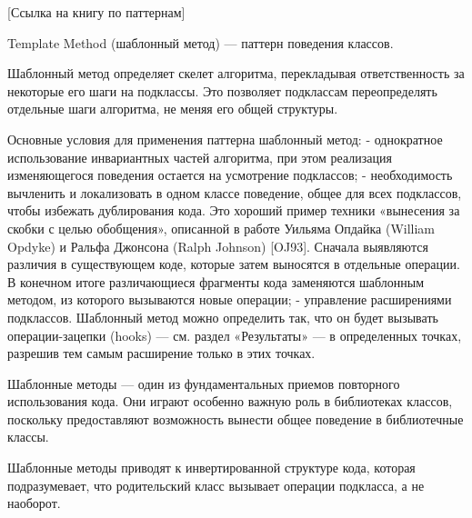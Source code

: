 


[Ссылка на книгу по паттернам]

Template Method (шаблонный метод) — паттерн поведения классов.

Шаблонный метод определяет скелет алгоритма, перекладывая ответственность за некоторые его шаги на подклассы. Это позволяет подклассам переопределять отдельные шаги алгоритма, не меняя его общей структуры.

Основные условия для применения паттерна шаблонный метод:
- однократное использование инвариантных частей алгоритма, при этом реализация изменяющегося поведения остается на усмотрение подклассов;
- необходимость вычленить и локализовать в одном классе поведение,
общее для всех подклассов, чтобы избежать дублирования кода. Это
хороший пример техники «вынесения за скобки с целью обобщения»,
описанной в работе Уильяма Опдайка (William Opdyke) и Ральфа
Джонсона (Ralph Johnson) [OJ93]. Сначала выявляются различия в существующем коде, которые затем выносятся в отдельные операции.
В конечном итоге различающиеся фрагменты кода заменяются шаблонным методом, из которого вызываются новые операции;
- управление расширениями подклассов. Шаблонный метод можно определить так, что он будет вызывать операции-зацепки (hooks) — см. раздел «Результаты» — в определенных точках, разрешив тем самым расширение только в этих точках.

Шаблонные методы — один из фундаментальных приемов повторного
использования кода. Они играют особенно важную роль в библиотеках
классов, поскольку предоставляют возможность вынести общее поведение
в библиотечные классы.

Шаблонные методы приводят к инвертированной структуре кода, которая подразумевает, что родительский класс вызывает операции подкласса, а не наоборот.

\pagebreak
